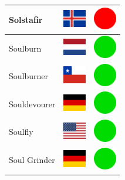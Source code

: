 \documentclass[12pt, a4paper, twoside]{report}
\begin{document}
\begin{center}
\begin{longtable}{|p{5cm}|p{2cm}|p{2cm}|}
 Solstafir                                                  & \includegraphics[width=1cm]{../img/flags/is} &   \includegraphics[width=1cm]{../likes/n} \\ \hline
 Soulburn                                                   & \includegraphics[width=1cm]{../img/flags/nl} &   \includegraphics[width=1cm]{../likes/y} \\ \hline
 Soulburner                                                 & \includegraphics[width=1cm]{../img/flags/cl} &   \includegraphics[width=1cm]{../likes/y} \\ \hline
 Souldevourer                                               & \includegraphics[width=1cm]{../img/flags/de} &   \includegraphics[width=1cm]{../likes/y} \\ \hline
 Soulfly                                                    & \includegraphics[width=1cm]{../img/flags/us} &   \includegraphics[width=1cm]{../likes/y} \\ \hline
 Soul Grinder                                               & \includegraphics[width=1cm]{../img/flags/de} &   \includegraphics[width=1cm]{../likes/y} \\ \hline

\end{longtable}
\end{center}
\end{document}
